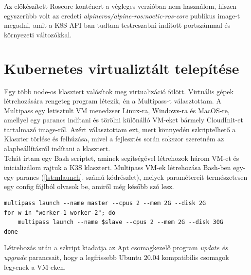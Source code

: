 \noindent
Az előkészített Roscore konténert a végleges verzióban nem használom, hiszen egyszerűbb volt az eredeti \emph{alpineros/alpine-ros:noetic-ros-core} publikus image-t megadni, amit a K8S API-ban tudtam testreszabni indított portszámmal és környezeti változókkal.

\section{Kubernetes virtualiztált telepítése}

Egy több node-os klasztert valósítok meg virtualizáció fölött. Virtuális gépek létrehozására rengeteg program létezik, én a Multipass-t választottam. A Multipass egy letisztult VM menedzser Linux-ra, Windows-ra és MacOS-re, amellyel egy parancs indítani és törölni különálló VM-eket bármely CloudInit-et tartalmazó image-ről. Azért választottam ezt, mert könnyedén szkriptelhető a Klaszter törlése és felhúzása, mivel a fejlesztés során sokszor szeretném az alapbeállításról indítani a klasztert. \\

\noindent
Tehát írtam egy Bash scriptet, aminek segítségével létrehozok három VM-et és inicializálom rajtuk a K3S klasztert. Multipass VM-ek létrehozása Bash-ben egy-egy parancs (\ref{lst:mlaunch}. számú kódrészlet), melyek paramétereit természetesen egy config fájlból olvasok be, amiről még később szó lesz.
\begin{minipage}{\linewidth}
\begin{lstlisting}[caption={Multipass VM-ek létrehozása},label={lst:mlaunch}]
multipass launch --name master --cpus 2 --mem 2G --disk 2G
for w in "worker-1 worker-2"; do
	multipass launch --name $slave --cpus 2 --mem 2G --disk 30G
done
\end{lstlisting} 
\end{minipage}
\noindent
Létrehozás után a szkript kiadatja az Apt csomagkezelő program \emph{update és upgrade} parancsait, hogy a legfrissebb Ubuntu 20.04 kompatibilis csomagok legyenek a VM-eken. \\

